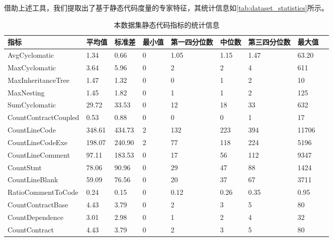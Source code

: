 借助上述工具，我们提取出了基于静态代码度量的专家特征，其统计信息如\autoref{tab:dataset_statistics}所示。
\begin{table}[htbp]
    \caption{\label{tab:dataset_statistics}本数据集静态代码指标的统计信息}
    \small
    \renewcommand{\arraystretch}{1.3}
    \begin{tabularx}{\linewidth}
        {p{3cm}<{\centering}X<{\centering}X<{\centering}p{1.5cm}<{\centering}X<{\centering}X<{\centering}X<{\centering}X<{\centering}X<{\centering}}
    \hline
    \textbf{指标}                    & \textbf{平均值}    & \textbf{标准差}    & \textbf{最小值} & \textbf{第一四分位数} & \textbf{中位数}  & \textbf{第三四分位数} & \textbf{最大值}   \\ \hline
    AvgCyclomatic         & 1.34   & 0.66   & 0   & 1.05   & 1.15 & 1.47   & 63.20 \\
    MaxCyclomatic         & 3.64   & 5.96   & 0   & 2      & 2    & 4      & 611   \\
    MaxInheritanceTree    & 1.47   & 1.32   & 0   & 0      & 1    & 2      & 10    \\
    MaxNesting            & 1.45   & 1.82   & 0   & 1      & 1    & 2      & 125   \\
    SumCyclomatic         & 29.72  & 33.53  & 0   & 12     & 18   & 33     & 632   \\
    CountContractCoupled  & 0.53   & 0.88   & 0   & 0      & 0    & 1      & 17    \\ \hline
    CountLineCode         & 348.61 & 434.73 & 2   & 132    & 223  & 394    & 11706 \\
    CountLineCodeExe      & 198.07 & 240.90 & 2   & 77     & 118  & 224    & 5196  \\
    CountLineComment      & 97.11  & 183.53 & 0   & 17     & 56   & 112    & 9347  \\
    CountStmt             & 78.06  & 90.96  & 0   & 29     & 47   & 88     & 1424  \\
    CountLineBlank        & 59.09  & 76.56  & 0   & 20     & 37   & 67     & 3711  \\
    RatioCommentToCode    & 0.24   & 0.15   & 0   & 0.12   & 0.26 & 0.35   & 0.95  \\ \hline
    CountContractBase     & 4.43   & 3.79   & 0   & 2      & 3    & 5      & 80    \\
    CountDependence       & 3.01   & 2.98   & 0   & 1      & 2    & 4      & 32    \\
    CountContract         & 4.43   & 3.79   & 0   & 2      & 3    & 5      & 80    \\

\end{tabularx}
\end{table}
